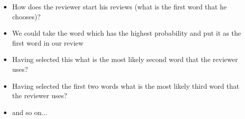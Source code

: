 \begin{frame}
\begin{columns}
		\begin{overlayarea}{\textwidth}{\textheight}
			\begin{itemize}\justifying
				\item<1-> How does the reviewer start his reviews (what is the first word that he chooses)?
				\item<2-> We could take the word which has the highest probability and put it as the first word in our review 
				\item<3-> Having selected this what is the most likely second word that the reviewer uses?
				\item<4-> Having selected the first two words what is the most likely third word that the reviewer uses?
				\item<5-> and so on...
			\end{itemize}
		\end{overlayarea}
	\end{columns}
\end{frame}

